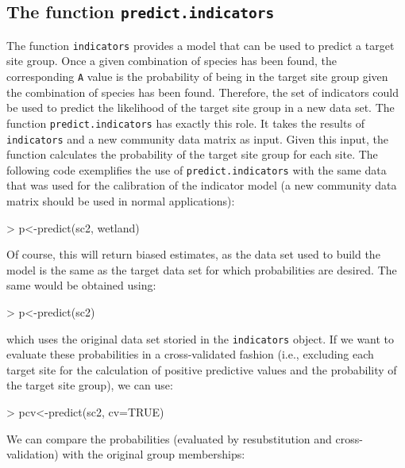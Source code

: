 \documentclass[11pt,a4paper]{article}
\begin{document}
\subsection{The function \texttt{predict.indicators}}
The function \texttt{indicators} provides a model that can be used to predict a target site group. Once a given combination of species has been found, the corresponding \texttt{A} value is the probability of being in the target site group given the combination of species has been found. Therefore, the set of indicators could be used to predict the likelihood of the target site group in a new data set. The function \texttt{predict.indicators} has exactly this role. It takes the results of \texttt{indicators} and a new community data matrix as input. Given this input, the function calculates the probability of the target site group for each site. The following code exemplifies the use of \texttt{predict.indicators} with the same data that was used for the calibration of the indicator model (a new community data matrix should be used in normal applications):
\begin{Schunk}
\begin{Sinput}
> p<-predict(sc2, wetland)
\end{Sinput}
\end{Schunk}
Of course, this will return biased estimates, as the data set used to build the model is the same as the target data set for which probabilities are desired. The same would be obtained using:
\begin{Schunk}
\begin{Sinput}
> p<-predict(sc2)
\end{Sinput}
\end{Schunk}
which uses the original data set storied in the \texttt{indicators} object. If we want to evaluate these probabilities in a cross-validated fashion (i.e., excluding each target site for the calculation of positive predictive values and the probability of the target site group), we can use:
\begin{Schunk}
\begin{Sinput}
> pcv<-predict(sc2, cv=TRUE)
\end{Sinput}
\end{Schunk}
We can compare the probabilities (evaluated by resubstitution and cross-validation) with the original group memberships:
\end{document}
